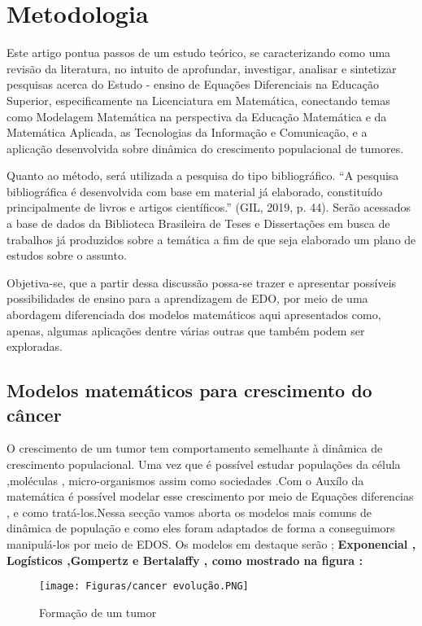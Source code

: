 \section{Metodologia}

Este artigo pontua passos de um estudo teórico, se caracterizando como uma revisão da literatura, no intuito de aprofundar, investigar, analisar e sintetizar pesquisas acerca do Estudo - ensino de Equações Diferenciais na Educação Superior, especificamente na Licenciatura em Matemática, conectando temas como Modelagem Matemática na perspectiva da Educação Matemática e da Matemática Aplicada, as Tecnologias da Informação e Comunicação, e a aplicação desenvolvida sobre dinâmica do crescimento populacional de tumores.

Quanto ao método, será utilizada a pesquisa do tipo bibliográfico. ``A pesquisa bibliográfica é desenvolvida com base em material já elaborado, constituído principalmente de livros e artigos científicos.'' (GIL, 2019, p. 44). Serão acessados a base de dados da Biblioteca Brasileira de Teses e Dissertações em busca de trabalhos já produzidos sobre a temática a fim de que seja elaborado um plano de estudos sobre o assunto.

Objetiva-se, que a partir dessa discussão possa-se trazer e apresentar possíveis possibilidades de ensino para a aprendizagem de EDO, por meio de uma abordagem diferenciada dos modelos matemáticos aqui apresentados como, apenas, algumas aplicações dentre várias outras que também podem ser exploradas.

\subsection{Modelos matemáticos para crescimento do câncer }



O crescimento de um tumor  tem comportamento semelhante à dinâmica de crescimento populacional. Uma vez que é possível estudar populações da célula ,moléculas , micro-organismos assim como sociedades .Com o Auxílo da matemática é  possível modelar esse crescimento por meio de Equações diferencias , e como tratá-los.Nessa secção vamos aborta os modelos mais comuns de dinâmica de população e como eles foram adaptados de forma a conseguimors manipulá-los por meio de EDOS. Os modelos em destaque serão ; \textbf{Exponencial , Logísticos ,Gompertz e Bertalaffy , como mostrado na figura : }


\begin{figure}[!h]
\centering
\caption{Formação de um tumor}
\texttt{[image: Figuras/cancer evolução.PNG]}\\

\end{figure}
\newpage

